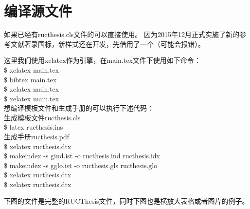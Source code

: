 \section{编译源文件}
如果已经有ructhesis.cls文件的可以直接使用。
因为2015年12月正式实施了新的参考文献著录国标，新样式还在开发，先借用了一个（可能会报错）。 \par
这里我们使用xelatex作为引擎，在main.tex文件下使用如下命令：\\
{\ttfamily
\$ xelatex main.tex\\
\$ bibtex main.tex\\
\$ xelatex main.tex\\
\$ xelatex main.tex\\}
想编译模板文件和生成手册的可以执行下述代码：\\
生成模板文件{\ttfamily ructhesis.cls}\\
{\ttfamily\$ latex ructhesis.ins}\\
生成手册{\ttfamily ructhesis.pdf\\
\$ xelatex ructhesis.dtx\\
\$ makeindex -s gind.ist -o ructhesis.ind ructhesis.idx\\
\$ makeindex -s gglo.ist -o ructhesis.gls ructhesis.glo\\
\$ xelatex ructhesis.dtx\\
\$ xelatex ructhesis.dtx}\par
下图的文件是完整的{\ttfamily RUCThesis}文件，同时下图也是横放大表格或者图片的例子。

